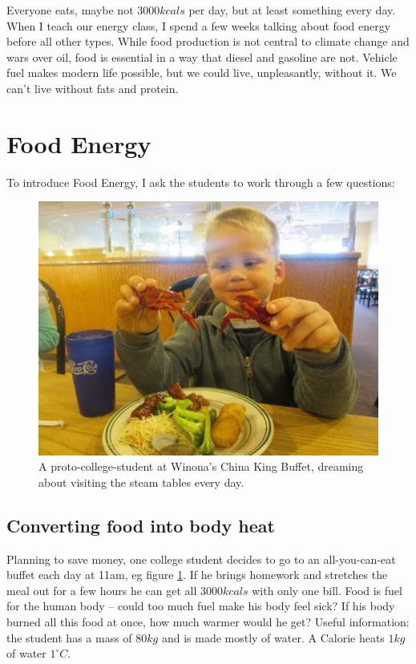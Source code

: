 \documentclass[prb,preprint]{revtex4-2}
\begin{document}
Everyone eats, maybe not $3000 kcals$ per day, but at least something every day.  When I teach our energy class,\cite{Energy_textbook,PFFP} 
I spend a few weeks talking about food energy before all other types.  While food production is not central to climate change and wars over oil, food is essential in a way that diesel and gasoline are not.  Vehicle fuel makes modern life possible, but we could live, unpleasantly, without it.  We can't live without fats and protein.  

\section{Food Energy}

To introduce Food Energy, I ask the students to work through a few questions:

\begin{figure}[h]
\centering
\includegraphics[width=\columnwidth]{at_the_buffet.jpg}
\caption{
A proto-college-student at Winona's China King Buffet, dreaming about visiting the steam tables every day. 
}
\label{buffet}
\end{figure}

\subsection{Converting food into body heat}
Planning to save money, one college student decides to go to an all-you-can-eat buffet each day at 11am, eg figure \ref{buffet}.  If he brings homework and stretches the meal out for a few hours he can get all $3000kcals$ with only one bill.  Food is fuel for the human body -- could too much fuel make his body feel sick? If his body burned all this food at once, how much warmer would he get? 
Useful information: the student has a mass of $80kg$ and is made mostly of water.  A Calorie heats $1 kg$ of water $1^{\circ}C$. 
\end{document}
